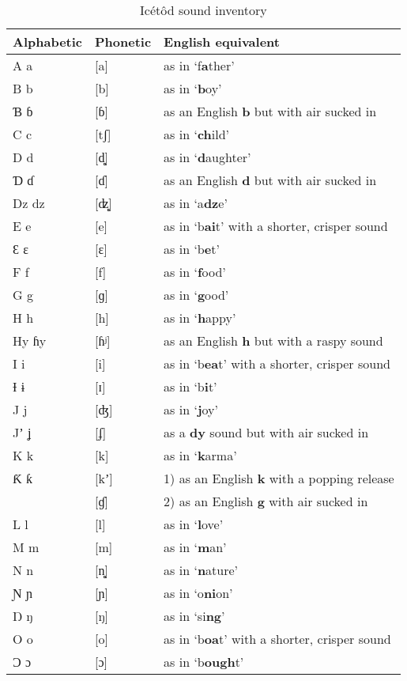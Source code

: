\begin{table}
\caption{Icétôd sound inventory}
\label{tab:phon:sounds}
\small
\begin{tabularx}{\textwidth}{llX}
\lsptoprule
Alphabetic & Phonetic & English equivalent\\
\midrule
A a & [a] & as in ‘f\textbf{a}ther’\\
B b & [b] & as in ‘\textbf{b}oy’\\
Ɓ  ɓ & [ɓ] & as an English \textbf{b} but with air sucked in\\
C c & [tʃ] & as in ‘\textbf{ch}ild’\\
D d & [d̻] & as in ‘\textbf{d}aughter’\\
Ɗ ɗ & [ɗ] & as an English \textbf{d} but with air sucked in\\
Dz dz & [ʣ̻] & as in ‘a\textbf{dz}e’\\
E e & [e] & as in ‘b\textbf{ai}t’ with a shorter, crisper sound\\
Ɛ ɛ & [ɛ] & as in ‘b\textbf{e}t’\\
F f & [f] & as in ‘\textbf{f}ood’\\
G g & [ɡ] & as in ‘\textbf{g}ood’\\
H h & [h] & as in ‘\textbf{h}appy’\\
Hy ɦy & [ɦʲ] & as an English \textbf{h} but with a raspy sound\\
I i & [i] & as in ‘b\textbf{ea}t’ with a shorter, crisper sound\\
Ɨ ɨ & [ɪ] & as in ‘b\textbf{i}t’\\
J j & [ʤ] & as in ‘\textbf{j}oy’\\
Jʼ ʝ & [ʄ] & as a \textbf{dy} sound but with air sucked in\\
K k & [k] & as in ‘\textbf{k}arma’\\
Ƙ ƙ & [kʼ] & 1) as an English \textbf{k} with a popping release\\
& [ɠ] & 2) as an English \textbf{g} with air sucked in\\
L l & [l] & as in ‘\textbf{l}ove’\\
M m & [m] & as in ‘\textbf{m}an’\\
N n & [n̻] & as in ‘\textbf{n}ature’\\
Ɲ ɲ & [ɲ] & as in ‘o\textbf{ni}on’\\
Ŋ ŋ & [ŋ] & as in ‘si\textbf{ng}’\\
O o & [o] & as in ‘b\textbf{oa}t’ with a shorter, crisper sound\\
Ɔ ɔ & [ɔ] & as in ‘b\textbf{ough}t’\\

\end{tabularx}
\end{table}
